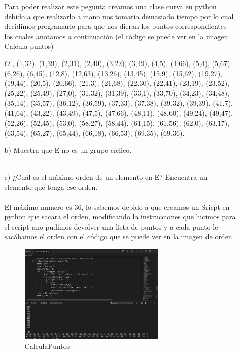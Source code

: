 \documentclass[10pt,a4paper]{article}
\begin{document}
\begin{enumerate}
\begin{itemize}
Para poder realizar este pegunta creamos una clase  curva en python debido a que realizarlo a mano nos tomaría demasiado tiempo por lo cual decidimos programarlo para que  nos dieran los puntos correspondientes los cuales anotamos a continuación (el código se puede ver en la imagen Calcula puntos) 


\newpage 
 $O$
, (1,32),
(1,39),
(2,31),
(2,40),
(3,22),
(3,49),
(4,5),
(4,66),
(5,4),
(5,67),
(6,26),
(6,45),
(12,8),
(12,63),
(13,26),
(13,45),
(15,9),
(15,62),
(19,27),
(19,44),
(20,5),
(20,66),
(21,3),
(21,68),
(22,30),
(22,41),
(23,19),
(23,52),
(25,22),
(25,49),
(27,0),
(31,32),
(31,39),
(33,1),
(33,70),
(34,23),
(34,48),
(35,14),
(35,57),
(36,12),
(36,59),
(37,33),
(37,38),
(39,32),
(39,39),
(41,7),
(41,64),
(43,22),
(43,49),
(47,5),
(47,66),
(48,11),
(48,60),
(49,24),
(49,47),
(52,26),
(52,45),
(53,0),
(58,27),
(58,44),
(61,15),
(61,56),
(62,0),
(63,17),
(63,54),
(65,27),
(65,44),
(66,18),
(66,53),
(69,35),
(69,36).\\
\item[b)] Muestra que E no es un grupo cíclico.\\\\

\item[c)] ¿Cuál es el máximo orden de un elemento en E? Encuentra un elemento que
tenga ese orden. \\\\

El máximo numero es 36, lo sabemos debido a que creamos un Sricpt en python que sacara el orden, modificando la instrucciones que hicimos para el script uno pudimos devolver una lista de puntos y a cada punto le sacábamos el orden con el  código que se puede ver en la imagen de orden  


\begin{figure}
\includegraphics[width=0.7\textwidth]{CalculaPuntos.png}
\caption{CalculaPuntos}
\label{fig:orden}
\end{figure}


\end{itemize}
\end{enumerate}
\end{document}
